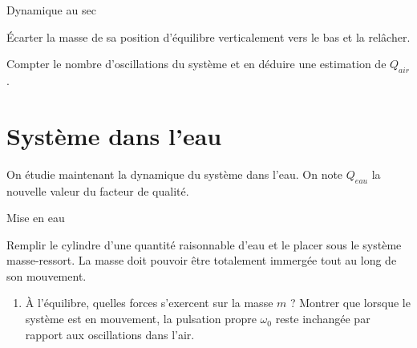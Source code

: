 \documentclass[a4paper,french,bookmarks]{article}
\begin{document}

\begin{experience}{Dynamique au sec}{}
    \begin{enumerate}
        \ithand Écarter la masse de sa position d’équilibre verticalement vers le bas et la relâcher.
        
        \ithand Compter le nombre d’oscillations du système et en déduire une estimation de $Q_{air}$.
    \end{enumerate}
\end{experience} 


\section{Système dans l’eau}

On étudie maintenant la dynamique du système dans l’eau. On note $Q_{eau}$ la nouvelle valeur du facteur de qualité.

\begin{experience}{Mise en eau}{}
    \begin{enumerate}
        \ithand Remplir le cylindre d’une quantité raisonnable d’eau et le placer sous le système masse-ressort. La masse doit pouvoir être totalement immergée tout au long de son mouvement.
    \end{enumerate}
\end{experience} 

\begin{enumerate}[resume]
    \item À l’équilibre, quelles forces s’exercent sur la masse $m$ ? Montrer que lorsque le système est en mouvement, la pulsation propre $\omega_0$ reste inchangée par rapport aux oscillations dans l’air.
    
\end{enumerate}
\end{document}
